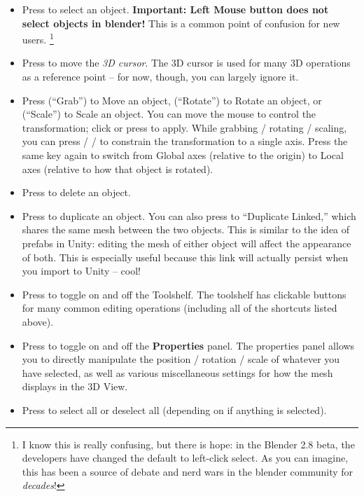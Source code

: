 \documentclass[11pt]{article}
\begin{document}
\begin{itemize}
    \item Press  to select an object.  \textbf{Important: Left Mouse button
    does not select objects in blender!}  This is a common point of confusion for new users.
    \footnote{I know this is really confusing,  but there is hope: in the Blender 2.8 beta, the 
    developers have changed the default to left-click select.  As you can imagine, this has been a
    source of debate and nerd wars in the blender community for \textit{decades}!}
    \item Press  to move the \textit{3D cursor}.  The 3D cursor is used for
    many 3D operations as a reference point -- for now, though, you can largely ignore it.
    \item Press  (``Grab'') to Move an object,  (``Rotate'') to Rotate an object,
    or  (``Scale'') to Scale an object.  You can move the mouse to control the 
    transformation; click  or press \keys{\return} to apply.  While grabbing
    / rotating / scaling, you can press  /  /  to constrain the 
    transformation to a single axis.  Press the same key again to switch from Global axes (relative
    to the origin) to Local axes (relative to how that object is rotated).
    \item Press  to delete an object.
    \item Press  to duplicate an object.  You can also press  to 
    ``Duplicate Linked,'' which shares the same mesh between the two objects.  This is similar to
    the idea of prefabs in Unity: editing the mesh of either object will affect the appearance of
    both.  This is especially useful because this link will actually persist when you import to
    Unity -- cool!
    \item Press  to toggle on and off the Toolshelf.  The toolshelf has clickable buttons
    for many common editing operations (including all of the shortcuts listed above).
    \item Press  to toggle on and off the \textbf{Properties} panel.  The properties panel
    allows you to directly manipulate the position / rotation / scale of whatever you have selected,
    as well as various miscellaneous settings for how the mesh displays in the 3D View.
    \item Press  to select all or deselect all (depending on if anything is selected).
\end{itemize}
\end{document}
